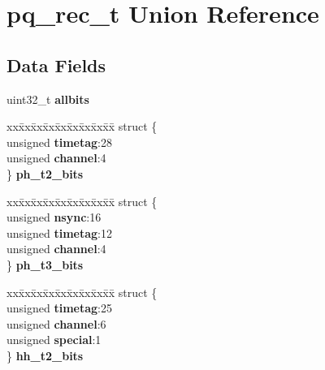 \hypertarget{unionpq__rec__t}{}\section{pq\+\_\+rec\+\_\+t Union Reference}
\label{unionpq__rec__t}
\subsection*{Data Fields}
\begin{DoxyCompactItemize}
\item 
\hypertarget{unionpq__rec__t_ae4f9726b7afba58864f25ee997f4a859}{}uint32\+\_\+t {\bfseries allbits}\label{unionpq__rec__t_ae4f9726b7afba58864f25ee997f4a859}

\item 
\hypertarget{unionpq__rec__t_a3c823829c837dc729b77a9f7d682d083}{}\begin{tabbing}
xx\=xx\=xx\=xx\=xx\=xx\=xx\=xx\=xx\=\kill
struct \{\\
\>unsigned {\bfseries timetag}:28\\
\>unsigned {\bfseries channel}:4\\
\} {\bfseries ph\_t2\_bits}\label{unionpq__rec__t_a3c823829c837dc729b77a9f7d682d083}
\\

\end{tabbing}\item 
\hypertarget{unionpq__rec__t_a9adb1d167808a136a64264ffbb33fa84}{}\begin{tabbing}
xx\=xx\=xx\=xx\=xx\=xx\=xx\=xx\=xx\=\kill
struct \{\\
\>unsigned {\bfseries nsync}:16\\
\>unsigned {\bfseries timetag}:12\\
\>unsigned {\bfseries channel}:4\\
\} {\bfseries ph\_t3\_bits}\label{unionpq__rec__t_a9adb1d167808a136a64264ffbb33fa84}
\\

\end{tabbing}\item 
\hypertarget{unionpq__rec__t_aaa646ba937e200e578b222ebf6d944ac}{}\begin{tabbing}
xx\=xx\=xx\=xx\=xx\=xx\=xx\=xx\=xx\=\kill
struct \{\\
\>unsigned {\bfseries timetag}:25\\
\>unsigned {\bfseries channel}:6\\
\>unsigned {\bfseries special}:1\\
\} {\bfseries hh\_t2\_bits}\label{unionpq__rec__t_aaa646ba937e200e578b222ebf6d944ac}
\\


\end{tabbing}
\end{DoxyCompactItemize}
